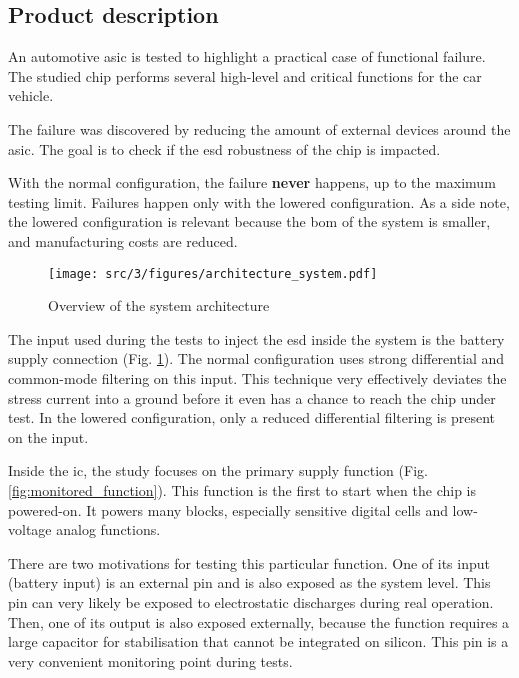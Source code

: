\subsection{Product description}
\label{sec:product-desc}

An automotive \gls{asic} is tested to highlight a practical case of functional failure.
The studied chip performs several high-level and critical functions for the car vehicle.

The failure was discovered by reducing the amount of external devices around the \gls{asic}.
The goal is to check if the \gls{esd} robustness of the chip is impacted.

With the normal configuration, the failure \textbf{never} happens, up to the maximum testing limit.
Failures happen only with the lowered configuration.
As a side note, the lowered configuration is relevant because the \gls{bom} of the system is smaller, and manufacturing costs are reduced.

\begin{figure}[!h]
  \centering
  \texttt{[image: src/3/figures/architecture\_system.pdf]}
  \caption{Overview of the system architecture}
  \label{fig:system_architecture}
\end{figure}

The input used during the tests to inject the \gls{esd} inside the system is the battery supply connection (Fig. \ref{fig:system_architecture}).
The normal configuration uses strong differential and common-mode filtering on this input.
This technique very effectively deviates the stress current into a ground before it even has a chance to reach the chip under test.
In the lowered configuration, only a reduced differential filtering is present on the input.

Inside the \gls{ic}, the study focuses on the primary supply function (Fig. \ref{fig:monitored_function}).
This function is the first to start when the chip is powered-on.
It powers many blocks, especially sensitive digital cells and low-voltage analog functions.

There are two motivations for testing this particular function.
One of its input (battery input) is an external pin and is also exposed as the system level.
This pin can very likely be exposed to electrostatic discharges during real operation.
Then, one of its output is also exposed externally, because the function requires a large capacitor for stabilisation that cannot be integrated on silicon.
This pin is a very convenient monitoring point during tests.

